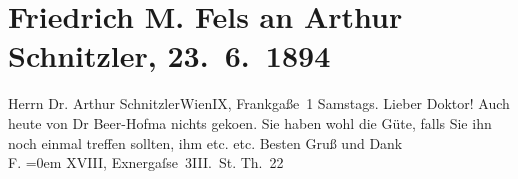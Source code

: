 

         
         \renewcommand{\erwaehntePersonen}{Personen: Richard Beer-Hofmann}
         \renewcommand{\erwaehnteOrte}{Orte: Frankgasse, IX., Alsergrund, Krütznergasse, Wien}
         \renewcommand{\erwaehnteWerke}{}
               \section[Friedrich M. Fels an Arthur Schnitzler, 23. 6. 1894]{ Friedrich M. Fels an Arthur Schnitzler, 23. 6. 1894}\nopagebreak{}\rehead{ }\begin{ledgroupsized}[t]{13cm}\normalsize\beginnumbering \toendnotes[C]{\smallbreak\pagebreak[2]} 
\pstart{}{\pb}Herrn Dr. Arthur Schnitzler\pend{}\pstart{}Wien\pend{}\pstart{}IX, Frankgaße 1\pend{}{\bigskip}\pstart
           \raggedleft{}{\pb}Samstags.\pend
           \pstart{}Lieber Doktor!\pend\pstart
           Auch heute von Dr Beer-Hofma{\geminationn} nichts geko{\geminationm}en. Sie haben wohl die Güte, falls Sie
               ihn noch einmal treffen sollten, ihm etc. etc.\pend
           \pstart
           Besten Gruß und Dank{\\[\baselineskip]}\spacefill\mbox{F.}\pend
           \leftskip=0em{}\pstart
           \noindent{}XVIII, Exnergaſse 3III. St. Th. 22\pend
           
         
         \endnumbering{}\end{ledgroupsized}  \newcommand{\dateiname}{L00340}\newcommand{\titel}{Friedrich M. Fels an Arthur Schnitzler, 23. 6. 1894}\newcommand{\editorInnen}{Martin Anton Müller und Gerd-Hermann Susen}
      
